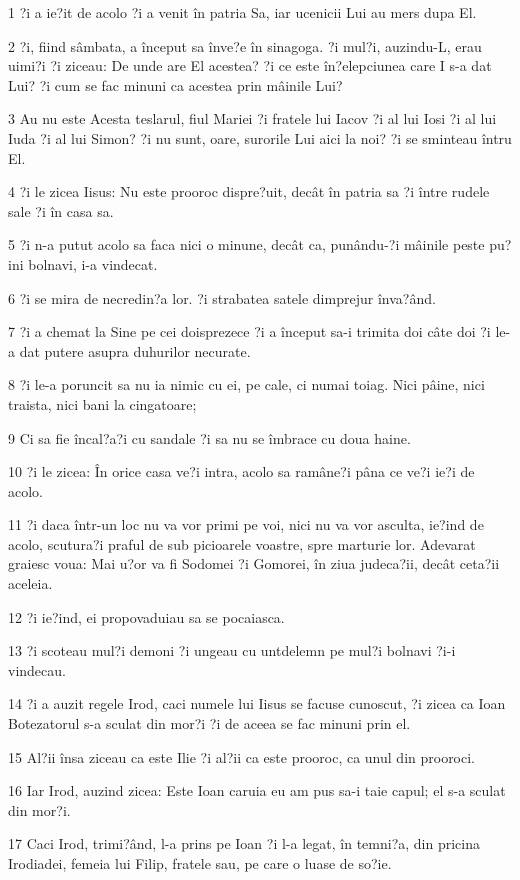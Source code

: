 \par 1 ?i a ie?it de acolo ?i a venit în patria Sa, iar ucenicii Lui au mers dupa El.
\par 2 ?i, fiind sâmbata, a început sa înve?e în sinagoga. ?i mul?i, auzindu-L, erau uimi?i ?i ziceau: De unde are El acestea? ?i ce este în?elepciunea care I s-a dat Lui? ?i cum se fac minuni ca acestea prin mâinile Lui?
\par 3 Au nu este Acesta teslarul, fiul Mariei ?i fratele lui Iacov ?i al lui Iosi ?i al lui Iuda ?i al lui Simon? ?i nu sunt, oare, surorile Lui aici la noi? ?i se sminteau întru El.
\par 4 ?i le zicea Iisus: Nu este prooroc dispre?uit, decât în patria sa ?i între rudele sale ?i în casa sa.
\par 5 ?i n-a putut acolo sa faca nici o minune, decât ca, punându-?i mâinile peste pu?ini bolnavi, i-a vindecat.
\par 6 ?i se mira de necredin?a lor. ?i strabatea satele dimprejur înva?ând.
\par 7 ?i a chemat la Sine pe cei doisprezece ?i a început sa-i trimita doi câte doi ?i le-a dat putere asupra duhurilor necurate.
\par 8 ?i le-a poruncit sa nu ia nimic cu ei, pe cale, ci numai toiag. Nici pâine, nici traista, nici bani la cingatoare;
\par 9 Ci sa fie încal?a?i cu sandale ?i sa nu se îmbrace cu doua haine.
\par 10 ?i le zicea: În orice casa ve?i intra, acolo sa ramâne?i pâna ce ve?i ie?i de acolo.
\par 11 ?i daca într-un loc nu va vor primi pe voi, nici nu va vor asculta, ie?ind de acolo, scutura?i praful de sub picioarele voastre, spre marturie lor. Adevarat graiesc voua: Mai u?or va fi Sodomei ?i Gomorei, în ziua judeca?ii, decât ceta?ii aceleia.
\par 12 ?i ie?ind, ei propovaduiau sa se pocaiasca.
\par 13 ?i scoteau mul?i demoni ?i ungeau cu untdelemn pe mul?i bolnavi ?i-i vindecau.
\par 14 ?i a auzit regele Irod, caci numele lui Iisus se facuse cunoscut, ?i zicea ca Ioan Botezatorul s-a sculat din mor?i ?i de aceea se fac minuni prin el.
\par 15 Al?ii însa ziceau ca este Ilie ?i al?ii ca este prooroc, ca unul din prooroci.
\par 16 Iar Irod, auzind zicea: Este Ioan caruia eu am pus sa-i taie capul; el s-a sculat din mor?i.
\par 17 Caci Irod, trimi?ând, l-a prins pe Ioan ?i l-a legat, în temni?a, din pricina Irodiadei, femeia lui Filip, fratele sau, pe care o luase de so?ie.
